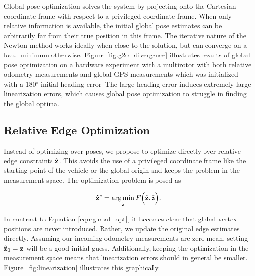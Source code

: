 Global pose optimization solves the system by projecting onto the Cartesian coordinate frame with respect to a privileged coordinate frame. When only relative information is available, the initial global pose estimates can be arbitrarily far from their true position in this frame. The iterative nature of the Newton method works ideally when close to the solution, but can converge on a local minimum otherwise.  Figure~\ref{fig:g2o_divergence} illustrates results of global pose optimization on a hardware experiment with a multirotor with both relative odometry measurements and global GPS measurements which was initialized with a 180$^\circ$ initial heading error.  The large heading error induces extremely large linearization errors, which causes global pose optimization to struggle in finding the global optima.



\subsection{Relative Edge Optimization}
Instead of optimizing over poses, we propose to optimize directly over relative edge constraints $\hat{\mathbf{z}}$.  This avoids the use of a privileged coordinate frame like the starting point of the vehicle or the global origin and keeps the problem in the measurement space.  The optimization problem is posed as

\begin{align}
  \mathbf{\hat{\mathbf{z}}}^* = \operatorname*{arg\,min}_{\hat{\mathbf{z}}} F\Big(\hat{\mathbf{z}},\bar{\mathbf{z}} \Big).
  \label{eqn:relative_opt}
\end{align}

In contrast to Equation \ref*{eqn:global_opt}, it becomes clear that global vertex positions are never introduced. Rather, we update the original edge estimates directly. Assuming our incoming odometry measurements are zero-mean, setting $\hat{\mathbf{z}}_0 = \bar{\mathbf{z}}$ will be a good initial guess.  Additionally, keeping the optimization in the measurement space means that linearization errors should in general be smaller.  Figure~\ref{fig:linearization} illustrates this graphically.

